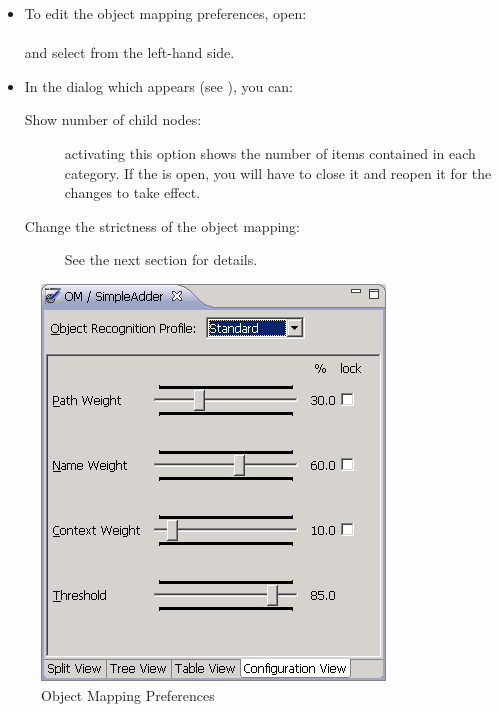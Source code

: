 \label{objectprefs}

\begin{itemize}
\item To edit the object mapping preferences, open:\\
\\
and select  from the left-hand side.
\item In the dialog which appears (see ), you can:
\begin{description}
\item[Show number of child nodes:]{activating this option shows the number of items contained in each category. If the \gdomeditor{} is open, you will have to close it and reopen it for the changes to take effect.}
\item[Change the strictness of the object mapping:]{See the next section  for details.}
\end{description}
\end{itemize}

\begin{figure} [htbp]
\begin{center}
\includegraphics{Tasks/Objectmapping/PS/objectmappingpref} 
\caption{Object Mapping Preferences}
\label{objectmappingpref}
\end{center}
\end{figure}

